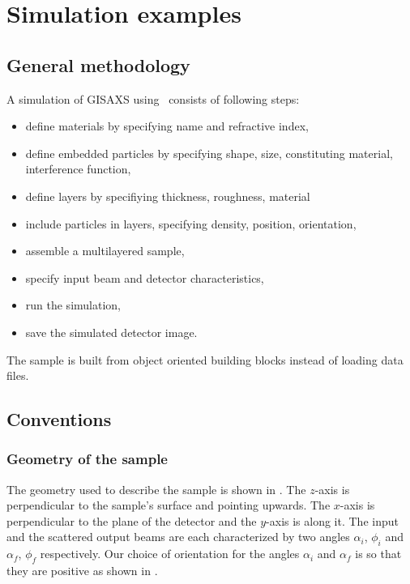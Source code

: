 \newpage
\chapter{Simulation examples}  

\section{General methodology}
A simulation of GISAXS using \BornAgain\ consists of following steps:
\begin{itemize}
\item define materials by specifying name and refractive index,
\item define embedded particles by specifying shape, size,
   constituting material, interference function,
\item define layers by specifiying thickness, roughness, material
\item include particles in layers, specifying density, position, orientation, 
\item assemble a multilayered sample,
\item specify input beam and detector characteristics,
\item run the simulation,
\item save the simulated detector image.
\end{itemize}

\noindent The sample is built from object oriented building blocks instead of loading data files.

\section{Conventions}

\subsection{Geometry of the sample}

\noindent The geometry used to describe the sample is shown in . The $z$-axis is perpendicular to the sample's
surface and pointing upwards. The $x$-axis  is perpendicular to the
plane of the detector and the $y$-axis is along it. The input and the
scattered output beams are each characterized by two angles
$\alpha_i$, $\phi_i$ and $\alpha_f$, $\phi_f$ respectively. Our choice of orientation for the
angles $\alpha_i$ and $\alpha_f$ is so that they are positive as shown in . \\


